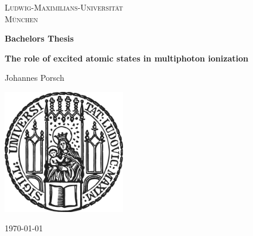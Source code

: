 \begin{titlepage}
    \centering
    
    \begin{center}
        {\Large\textsc{Ludwig-Maximilians-Universität}}\\
        \vspace{0.25cm}
        {\Large\textsc{München}}
    \end{center}

    \vspace{0.5cm}

    
    \vspace{2cm}

    {\Large \bfseries Bachelors Thesis}

    \vspace{0.5cm}
    
    {\huge\bfseries The role of excited
    atomic states in multiphoton ionization\\[0.4cm]}
    
    \vspace{1.5cm}
    
    {\Large Johannes Porsch}
    
    
    \vfill
    
    \includegraphics[width = 0.4\textwidth]{figures/sigillum.png}

    \vfill
    
    {\Large \today}
    
\end{titlepage}